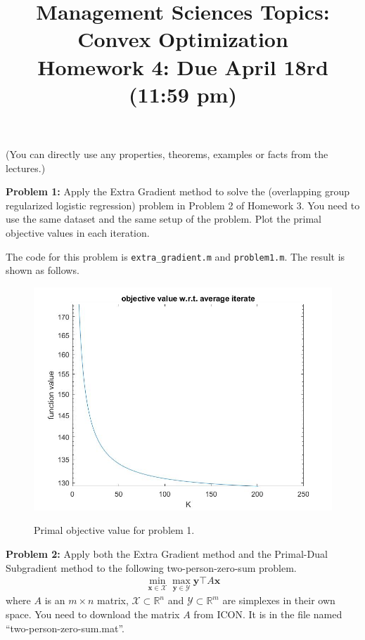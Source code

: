 \documentclass{article}
\newcommand{\bx}{{\mathbf x}}
\newcommand{\by}{{\mathbf y}}
\begin{document}
\title{Management Sciences Topics: Convex Optimization\\ Homework 4: Due April 18rd (11:59 pm) }
\date{}

\maketitle
\noindent(You can directly use any properties, theorems, examples or facts from the lectures.)
\bigskip

\noindent\textbf{Problem 1:}  Apply the Extra Gradient method to solve the (overlapping group regularized logistic regression) problem in Problem 2 of Homework 3. You need to use the same dataset and the same setup of the problem. Plot the primal objective values in each iteration.
\bigskip

The code for this problem is \texttt{extra\_gradient.m} and \texttt{problem1.m}. The result is shown as follows.

\begin{figure}[h]
\centering
\includegraphics[scale=0.3]{problem1.jpg}
\label{problem1-result}
\caption{Primal objective value for problem 1.}
\end{figure}

\noindent\textbf{Problem 2:} Apply both the Extra Gradient method and the Primal-Dual Subgradient method to the following two-person-zero-sum problem. 
\begin{eqnarray*}
\min_{\bx\in\mathcal{X}}\max_{\by\in\mathcal{Y}}\by\top A \bx
\end{eqnarray*}
where $A$ is an $m\times n$ matrix, $\mathcal{X}\subset\mathbb{R}^n$ and $\mathcal{Y}\subset\mathbb{R}^m$ are simplexes in their own space. You need to download the matrix $A$ from ICON. It is in the file named ``two-person-zero-sum.mat''.
\bigskip
\end{document}
